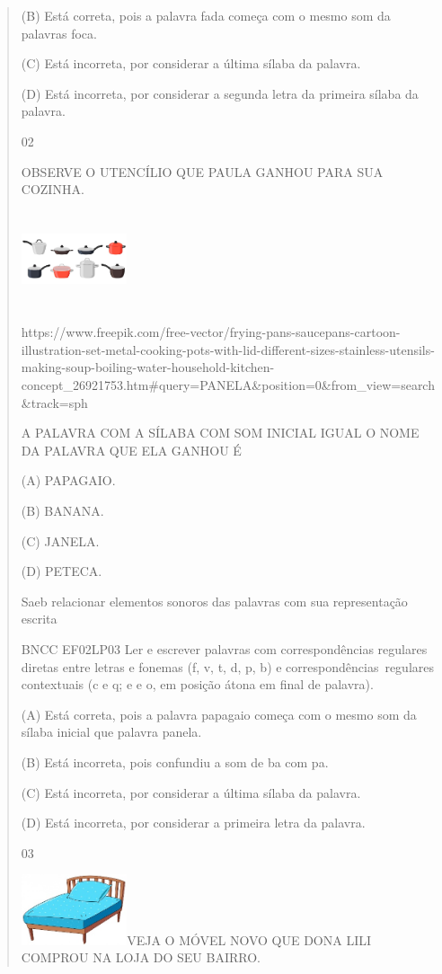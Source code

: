 \begin{verse}
{{{{{{(B) Está correta, pois a palavra fada começa com o mesmo som da palavras
foca.

(C) Está incorreta, por considerar a última sílaba da palavra.

(D) Está incorreta, por considerar a segunda letra da primeira sílaba da
palavra.

\num{02}

OBSERVE O UTENCÍLIO QUE PAULA GANHOU PARA SUA COZINHA.

\includegraphics[width=1.22222in,height=1.11389in]{media/image19.jpeg}

https://www.freepik.com/free-vector/frying-pans-saucepans-cartoon-illustration-set-metal-cooking-pots-with-lid-different-sizes-stainless-utensils-making-soup-boiling-water-household-kitchen-concept\_26921753.htm\#query=PANELA\&position=0\&from\_view=search\&track=sph

\protect\hypertarget{_Hlk129268378}{}{}A PALAVRA COM A SÍLABA COM SOM
INICIAL IGUAL O NOME DA PALAVRA QUE ELA GANHOU É

(A) PAPAGAIO.

(B) BANANA.

(C) JANELA.

(D) PETECA.

Saeb relacionar elementos sonoros das palavras com sua representação
escrita

BNCC EF02LP03 Ler e escrever palavras com correspondências regulares
diretas entre letras e fonemas (f, v, t, d, p, b) e
correspondências~regulares contextuais (c e q; e e o, em posição átona
em final de palavra).

(A) Está correta, pois a palavra papagaio começa com o mesmo som da
sílaba inicial que palavra panela.

(B) Está incorreta, pois confundiu a som de ba com pa.

(C) Está incorreta, por considerar a última sílaba da palavra.

(D) Está incorreta, por considerar a primeira letra da palavra.

\num{03}

\includegraphics[width=1.22293in,height=0.81839in]{media/image140.jpeg}VEJA
O MÓVEL NOVO QUE DONA LILI COMPROU NA LOJA DO SEU BAIRRO.

}}}}}}
\end{verse}
